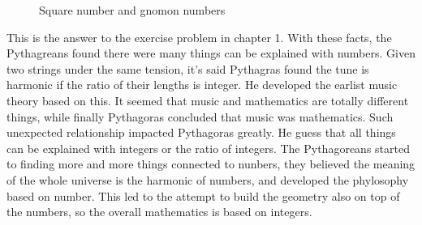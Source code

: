 \documentclass{article}
\begin{document}
\begin{figure}[htbp]
\centering
{}
\caption{Square number and gnomon numbers}
\label{fig:square-num}
\end{figure}

This is the answer to the exercise problem in chapter 1. With these facts, the Pythagreans found there were many things can be explained with numbers. Given two strings under the same tension, it's said Pythagras found the tune is harmonic if the ratio of their lengths is integer. He developed the earlist music theory based on this. It seemed that music and mathematics are totally different things, while finally Pythagoras concluded that music was mathematics. Such unexpected relationship impacted Pythagoras greatly. He guess that all things can be explained with integers or the ratio of integers. The Pythagoreans started to finding more and more things connected to nunbers, they believed the meaning of the whole universe is the harmonic of numbers, and developed the phylosophy based on number. This led to the attempt to build the geometry also on top of the numbers, so the overall mathematics is based on integers.
\end{document}
